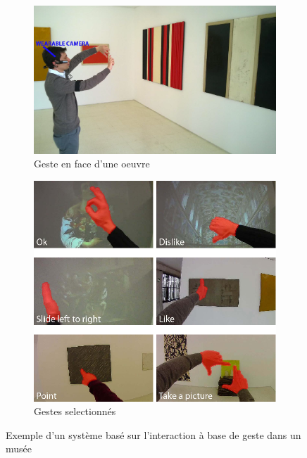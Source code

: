 \begin{figure}[htbp]
\begin{subfigure}{0.49\textwidth}
\includegraphics[width=\linewidth]{figures/wearable.PNG}
\caption{Geste en face d'une oeuvre} \label{fig:exempleGestea}
\end{subfigure}
\hspace*{\fill} %
\begin{subfigure}{0.49\textwidth}
\includegraphics[width=\linewidth]{figures/gesteBaradli.png}
\caption{Gestes selectionnés} \label{fig:exempleGesteb}
\end{subfigure}
\caption{Exemple d'un système basé sur l'interaction à base de geste dans un musée~\cite{baraldi2015gesture}} \label{fig:exempleGeste}
\end{figure}




